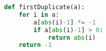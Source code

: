 \documentclass[a4paper]{article}
\begin{document}
\begin{lstlisting}[language=Python]
def firstDuplicate(a):
    for i in a:
        a[abs(i)-1] *= -1
        if a[abs(i)-1] > 0:
            return abs(i)
    return -1
\end{lstlisting}
\end{document}
